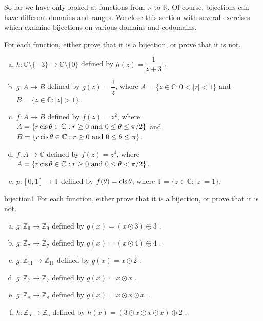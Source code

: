  
So far we have only looked at functions from $\mathbb{R}$ to $\mathbb{R}$.  Of course, bijections can have different domains and ranges. We close this section with several exercises which examine bijections on 
various domains and  codomains.

\begin{exercise}{} 
For each function, either prove that it is a bijection, or prove that it is not.
\begin{enumerate}[(a)]
\item
 $h \colon {\mathbb C}\setminus \{-3\}  \to {\mathbb C}\setminus \{0\} $ defined by $h(z) =  \dfrac{1}{z+3}$ .
\item
 $g \colon A   \to B $ defined by $g(z) =  \dfrac{1}{z}$, where $A =  \{z \in \mathbb{C}: 0<|z|<1\}$ and $B =  \{z \in \mathbb{C}: |z|>1\}$.
\item
 $f \colon A   \to B $ defined by $f(z) =  z^2$, where $A =  \{ r \operatorname{cis} \theta \in \mathbb{C}: r \ge 0 \text{ and } 0 \le \theta \le \pi/2 \}$ and 
$B =  \{ r \operatorname{cis} \theta \in \mathbb{C}: r \ge 0 \text{ and } 0 \le \theta \le \pi \}$.
\item
 $f \colon A   \to \mathbb{C} $ defined by $f(z) =  z^4$, where $A =  \{ r \operatorname{cis} \theta \in \mathbb{C}: r \ge 0 \text{ and } 0 \le \theta < \pi/2 \}$.
\item
 $p \colon [0,1]   \to \mathbb{T} $ defined by $f(\theta) =  \operatorname{cis} \theta$, where $\mathbb{T} =  \{ z \in \mathbb{C}: |z|=1 \}$.
 \end{enumerate}
\end{exercise}


\begin{exercise}{bijection1} 
For each function, either prove that it is a bijection, or prove that it is not.
\begin{enumerate}[(a)]
\item \label{modular9}
 $g \colon {\mathbb Z}_9 \to {\mathbb Z}_9$ defined by $g(x)= (x \odot 3) \oplus 3$ .
\item \label{modular_m6}
 $g \colon {\mathbb Z}_7 \to {\mathbb Z}_7$ defined by $g(x) = (x \odot 4) \oplus 4 $ .
\item \label{modular_m7}
 $g \colon {\mathbb Z}_{11} \to {\mathbb Z}_{11}$ defined by $g(x) =  x \odot 2$ .
\item 
 $g \colon {\mathbb Z}_7 \to {\mathbb Z}_7$ defined by $g(x)= x \odot x$ .
\item 
 $g \colon {\mathbb Z}_8 \to {\mathbb Z}_8$ defined by $g(x)= x \odot x \odot x$ .
\item 
 $h \colon {\mathbb Z}_5 \to {\mathbb Z}_5$ defined by $h(x)= (3 \odot x \odot x \odot x) \oplus 2$ .
 \end{enumerate}
\end{exercise}


